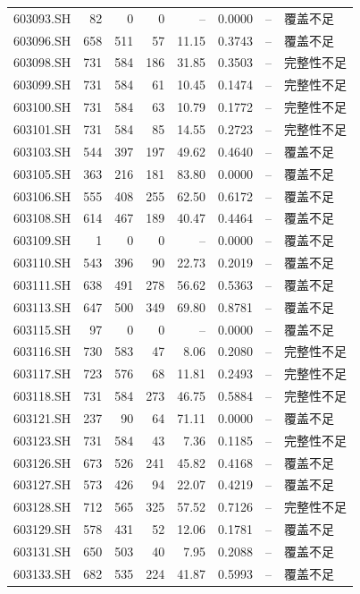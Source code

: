 \documentclass[10pt,a4paper]{article}
\begin{document}
\begin{longtable}{lrrr r r r l}
603093.SH & 82 & 0 & 0 & -- & 0.0000 & -- & 覆盖不足\\
603096.SH & 658 & 511 & 57 & 11.15 & 0.3743 & -- & 覆盖不足\\
603098.SH & 731 & 584 & 186 & 31.85 & 0.3503 & -- & 完整性不足\\
603099.SH & 731 & 584 & 61 & 10.45 & 0.1474 & -- & 完整性不足\\
603100.SH & 731 & 584 & 63 & 10.79 & 0.1772 & -- & 完整性不足\\
603101.SH & 731 & 584 & 85 & 14.55 & 0.2723 & -- & 完整性不足\\
603103.SH & 544 & 397 & 197 & 49.62 & 0.4640 & -- & 覆盖不足\\
603105.SH & 363 & 216 & 181 & 83.80 & 0.0000 & -- & 覆盖不足\\
603106.SH & 555 & 408 & 255 & 62.50 & 0.6172 & -- & 覆盖不足\\
603108.SH & 614 & 467 & 189 & 40.47 & 0.4464 & -- & 覆盖不足\\
603109.SH & 1 & 0 & 0 & -- & 0.0000 & -- & 覆盖不足\\
603110.SH & 543 & 396 & 90 & 22.73 & 0.2019 & -- & 覆盖不足\\
603111.SH & 638 & 491 & 278 & 56.62 & 0.5363 & -- & 覆盖不足\\
603113.SH & 647 & 500 & 349 & 69.80 & 0.8781 & -- & 覆盖不足\\
603115.SH & 97 & 0 & 0 & -- & 0.0000 & -- & 覆盖不足\\
603116.SH & 730 & 583 & 47 & 8.06 & 0.2080 & -- & 完整性不足\\
603117.SH & 723 & 576 & 68 & 11.81 & 0.2493 & -- & 完整性不足\\
603118.SH & 731 & 584 & 273 & 46.75 & 0.5884 & -- & 完整性不足\\
603121.SH & 237 & 90 & 64 & 71.11 & 0.0000 & -- & 覆盖不足\\
603123.SH & 731 & 584 & 43 & 7.36 & 0.1185 & -- & 完整性不足\\
603126.SH & 673 & 526 & 241 & 45.82 & 0.4168 & -- & 覆盖不足\\
603127.SH & 573 & 426 & 94 & 22.07 & 0.4219 & -- & 覆盖不足\\
603128.SH & 712 & 565 & 325 & 57.52 & 0.7126 & -- & 完整性不足\\
603129.SH & 578 & 431 & 52 & 12.06 & 0.1781 & -- & 覆盖不足\\
603131.SH & 650 & 503 & 40 & 7.95 & 0.2088 & -- & 覆盖不足\\
603133.SH & 682 & 535 & 224 & 41.87 & 0.5993 & -- & 覆盖不足\\

\end{longtable}
\end{document}
